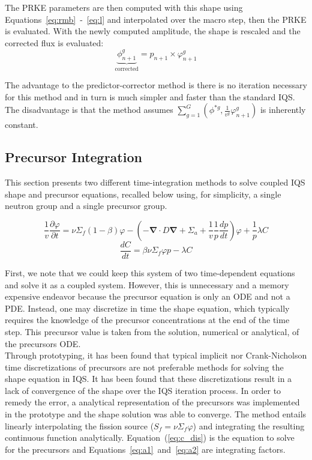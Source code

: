 \documentclass[12pt]{scrartcl}
\renewcommand{\div}{\bs{\nabla}\! \cdot \!}
\newcommand{\grad}{\bs{\nabla}}
\newcommand{\eqt}[1]{Equation~(\ref{#1})}                     %
\newcommand{\bs}[1]{\mathbf{#1}}
\newcommand{\be}{\begin{equation}}
\newcommand{\ee}{\end{equation}}
\begin{document}
The PRKE parameters are then computed with this shape using Equations~\ref{eq:rmb}~-~\ref{eq:l} and interpolated over the macro step, then the PRKE is evaluated.  With the newly computed amplitude, the shape is rescaled and the corrected flux is evaluated:
\be
\underbrace{\phi^g_{n+1}}_{\text{corrected}} = p_{n+1} \times \varphi^g_{n+1}
\ee

The advantage to the predictor-corrector method is there is no iteration necessary for this method and in turn is much simpler and faster than the standard IQS.  The disadvantage is that the method assumes $\sum_{g=1}^G\left(\phi^{*g},\frac{1}{v^g}\varphi^g_{n+1}\right)$ is inherently constant.

\subsection{Precursor Integration}
\label{sect:prec}

This section presents two different time-integration methods to solve coupled IQS shape and precursor equations, recalled below using, for simplicity, a single neutron group and a single precursor group.

\be
\frac{1}{v}\frac{\partial\varphi}{\partial t}=\nu\Sigma_f(1-\beta)\varphi-\left(-\div D \grad + \Sigma_a + \frac{1}{v}\frac{1}{p}\frac{dp}{dt}\right)\varphi+\frac{1}{p}\lambda C 
\ee
\be
\frac{dC}{dt} = \beta\nu \Sigma_f \varphi p - \lambda C
\ee

First, we note that we could keep this system of two time-dependent equations and solve it as a coupled system. However, this is unnecessary and a memory expensive endeavor because the precursor equation is only an ODE and not a PDE. Instead, one may discretize in time the shape equation, which typically requires the knowledge of the precursor concentrations at the end of the time step. This precursor value is taken from the solution, numerical or analytical, of the precursors ODE.  \\

Through prototyping, it has been found that typical implicit nor Crank-Nicholson time discretizations of precursors are not preferable methods for solving the shape equation in IQS.  It has been found that these discretizations result in a lack of convergence of the shape over the IQS iteration process.  In order to remedy the error, a analytical representation of the precursors was implemented in the prototype and the shape solution was able to converge.  The method entails linearly interpolating the fission source ($S_f = \nu \Sigma_f \varphi$) and integrating the resulting continuous function analytically. \eqt{eq:c_dis} is the equation to solve for the precursors and Equations~\ref{eq:a1}~and~\ref{eq:a2} are integrating factors.
\end{document}
